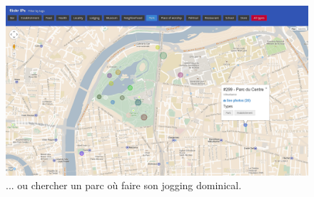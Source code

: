     \begin{figure}[H]
        \centering
        \includegraphics[scale=0.25]{../screenshots/ui-filter-park.png}
        \caption{... ou chercher un parc où faire son jogging dominical.}
        \label{diagram:ui-filter-park}
    \end{figure}

    \pagebreak

